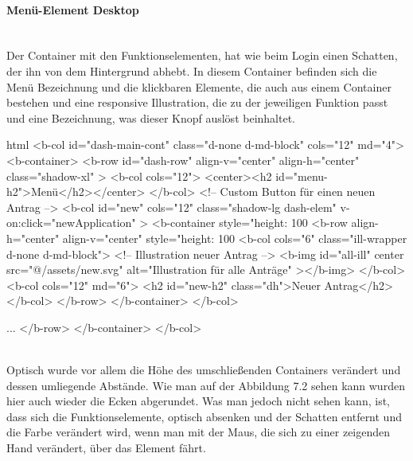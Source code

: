 \paragraph{Menü-Element Desktop}
~\\
Der Container mit den Funktionselementen, hat wie beim Login einen Schatten, der ihn von dem Hintergrund abhebt. In diesem Container befinden sich die Menü Bezeichnung und die klickbaren Elemente, die auch aus einem Container bestehen und eine responsive Illustration, die zu der jeweiligen Funktion passt und eine Bezeichnung, was dieser Knopf auslöst beinhaltet.
\begin{code}{html}
<b-col id="dash-main-cont" class="d-none d-md-block" cols="12" md="4">
	<b-container>
		<b-row
			id="dash-row"
			align-v="center"
			align-h="center"
			class="shadow-xl"
		>
			<b-col cols="12">
				<center><h2 id="menu-h2">Menü</h2></center>
			</b-col>
			<!-- Custom Button für einen neuen Antrag -->
			<b-col
				id="new"
				cols="12"
				class="shadow-lg dash-elem"
				v-on:click="newApplication"
			>
				<b-container style="height: 100%
					<b-row align-h="center" align-v="center" style="height: 100%
						<b-col cols="6" class="ill-wrapper d-none d-md-block">
						<!-- Illustration neuer Antrag -->
							<b-img
								id="all-ill"
								center
								src="@/assets/new.svg"
								alt="Illustration für alle Anträge"
							></b-img>
						</b-col>
						<b-col cols="12" md="6">
							<h2 id="new-h2" class="dh">Neuer Antrag</h2>
						</b-col>
					</b-row>
				</b-container>
			</b-col>
			
			...
		</b-row>
	</b-container>
</b-col>
\end{code}
	\label{list:menuhtml} ~\\
Optisch wurde vor allem die Höhe des umschließenden Containers verändert und dessen umliegende Abstände. Wie man auf der Abbildung 7.2 sehen kann wurden hier auch wieder die Ecken abgerundet. Was man jedoch nicht sehen kann, ist, dass sich die Funktionselemente, optisch absenken und der Schatten entfernt und die Farbe verändert wird, wenn man mit der Maus, die sich zu einer zeigenden Hand verändert, über das Element fährt. 
	\label{list:cssmenu} ~\\
